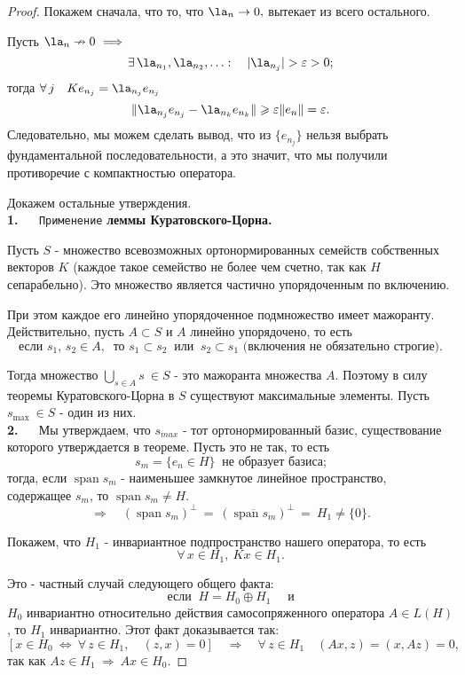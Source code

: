 \documentclass[a4paper]{article}
\DeclareMathOperator{\Span}{span}
\begin{document}
\begin{proof}
Покажем сначала, что то, что $\la_n \rightarrow 0,$ вытекает из
всего остального.

Пусть $\la_n \nrightarrow 0 \ \Longrightarrow$
$$
\exists\, \la_{n_1}, \la_{n_2}, \ldots : \quad |\la_{n_j}| >
\varepsilon > 0;
$$
тогда $\forall\, j \quad K e_{n_j} = \la_{n_j} e_{n_j}$
$$
\|\la_{n_j} e_{n_j} - \la_{n_k} e_{n_k}\| \geqslant \varepsilon
\|e_n\| = \varepsilon.
$$
Следовательно, мы можем сделать вывод, что из $\{e_{n_j}\}$ нельзя
выбрать фундаментальной последовательности, а это значит, что мы
получили противоречие с компактностью оператора.


Докажем остальные утверждения. \\

\textbf{1.} $\quad$ \texttt{Применение} \textbf{леммы
Куратовского-Цорна.}

Пусть $S$ - множество всевозможных ортонормированных семейств
собственных векторов $K$ (каждое такое семейство не более чем
счетно, так как $H$ сепарабельно). Это множество является частично
упорядоченным по включению.

При этом каждое его линейно упорядоченное подмножество имеет
мажоранту. Действительно, пусть $A \subset S$ и $A$ линейно
упорядочено, то есть
$$
\mbox{если  }s_1,\, s_2 \in A, \ \mbox{ то } s_1 \subset s_2 \
\mbox{ или }\ s_2 \subset s_1 \mbox{ (включения не обязательно
строгие).}
$$

Тогда множество $\bigcup\limits_{s\in A} s \ \in S$ - это
мажоранта множества $A.$ Поэтому в силу теоремы Куратовского-Цорна
в $S$ существуют максимальные элементы. Пусть $s_{\max} \ \in S$ -
один из них.\\

\textbf{2.} $\quad$ Мы утверждаем, что $s_{max}$ - тот
ортонормированный базис, существование которого утверждается в
теореме. Пусть это не так, то есть
$$
s_m = \{e_n \in H\} \ \mbox{ не образует базиса;}
$$
тогда, если $\Span s_{m}$ - наименьшее замкнутое линейное
пространство, содержащее $s_m$, то $\Span s_{m} \not = H.$
$$
\Longrightarrow \quad (\Span s_m)^{\bot} \ = \ (\overline{\Span
s_{m}})^{\bot}\ = \ H_1 \not = \{0\}.
$$

Покажем, что $H_1$ - инвариантное подпространство нашего
оператора, то есть
$$
\forall\, x\in H_1, \ Kx\in H_1.
$$

Это - частный случай следующего общего факта:
$$
\mbox{ если }\ H = H_0 \oplus H_1 \quad \mbox{ и }
$$
$H_0$ инвариантно относительно действия самосопряженного оператора
$A\in L (H)$, то $H_1$ инвариантно. Этот факт доказывается так:
$$
[x \in H_0 \ \Leftrightarrow\ \forall \, z\in H_1, \quad (z, x) =
0] \quad \Longrightarrow \quad \forall \, z \in H_1 \quad (Ax, z)
= (x, Az) = 0,
$$
так как $Az \in H_1 \ \Rightarrow \ Ax\in H_0.$


\end{proof}
\end{document}
